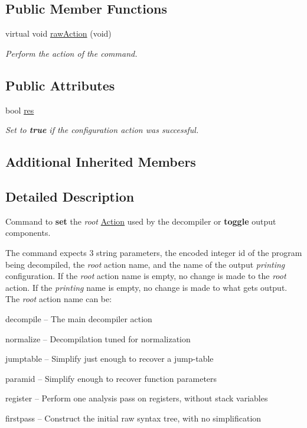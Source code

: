 \subsection*{Public Member Functions}
\begin{DoxyCompactItemize}
\item 
virtual void \mbox{\hyperlink{class_set_action_af53890c4472a36b4c78d0c97bb1f39d4}{raw\+Action}} (void)
\begin{DoxyCompactList}\small\item\em Perform the action of the command. \end{DoxyCompactList}\end{DoxyCompactItemize}
\subsection*{Public Attributes}
\begin{DoxyCompactItemize}
\item 
bool \mbox{\hyperlink{class_set_action_ae5987516b802495e4367f41b038d1d2d}{res}}
\begin{DoxyCompactList}\small\item\em Set to {\bfseries{true}} if the configuration action was successful. \end{DoxyCompactList}\end{DoxyCompactItemize}
\subsection*{Additional Inherited Members}


\subsection{Detailed Description}
Command to {\bfseries{set}} the {\itshape root} \mbox{\hyperlink{class_action}{Action}} used by the decompiler or {\bfseries{toggle}} output components. 

The command expects 3 string parameters, the encoded integer id of the program being decompiled, the {\itshape root} action name, and the name of the output {\itshape printing} configuration. If the {\itshape root} action name is empty, no change is made to the {\itshape root} action. If the {\itshape printing} name is empty, no change is made to what gets output. The {\itshape root} action name can be\+:
\begin{DoxyItemize}
\item decompile -- The main decompiler action
\item normalize -- Decompilation tuned for normalization
\item jumptable -- Simplify just enough to recover a jump-\/table
\item paramid -- Simplify enough to recover function parameters
\item register -- Perform one analysis pass on registers, without stack variables
\item firstpass -- Construct the initial raw syntax tree, with no simplification
\end{DoxyItemize}

